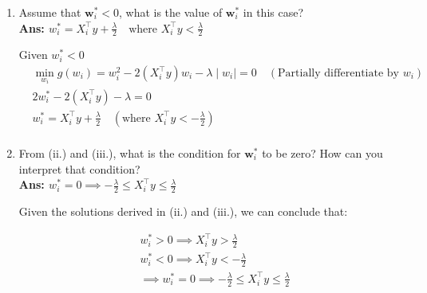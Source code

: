 \documentclass{article}
\theoremstyle{definition}
\theoremstyle{remark}
\begin{document}
\begin{enumerate}[font={\Large\bfseries},left=0pt]
\begin{tcolorbox}
\begin{enumerate}
\begin{enumerate}
				      \item Assume that $\bm{w}^*_i<0$, what is the value of $\bm{w}^*_i$ in this case? \\
				            \textbf{Ans: $w_i^* = X^\intercal_i y + \frac{\lambda}{2} \quad \text{where } X_i^\intercal y < \frac{\lambda}{2}$}

				            Given $w_i^* < 0$
				            \begin{align}
					             & \min_{w_i} g(w_i)  = w_i^2 - 2(X^\intercal_i y)w_i - \lambda \mid w_i \mid = 0 \quad (\text{Partially differentiate by } w_i) \\
					             & 2w_i^* - 2(X^\intercal_i y) - \lambda = 0                                                                                     \\
					             & w_i^* = X^\intercal_i y + \frac{\lambda}{2} \quad (\text{where } X_i^\intercal y< -\frac{\lambda}{2})                         \\
				            \end{align}

				      \item From (ii.) and (iii.), what is the condition for $\bm{w}^*_i$ to be zero? How can you interpret that condition? \\
				            \textbf{Ans: $w_i^* = 0 \implies -\frac{\lambda}{2} \le X_i^\intercal y \le \frac{\lambda}{2} $}

				            Given the solutions derived in (ii.) and (iii.), we can conclude that:

				            \begin{align}
					             & w_i^* > 0\implies  X_i^\intercal y > \frac{\lambda}{2}                                   \\
					             & w_i^* < 0 \implies X_i^\intercal y < -\frac{\lambda}{2}                                  \\
					             & \implies w_i^* = 0 \implies -\frac{\lambda}{2} \le X_i^\intercal y \le \frac{\lambda}{2} \\
				            \end{align}
			      \end{enumerate}


\end{enumerate}
\end{tcolorbox}
\end{enumerate}
\end{document}
